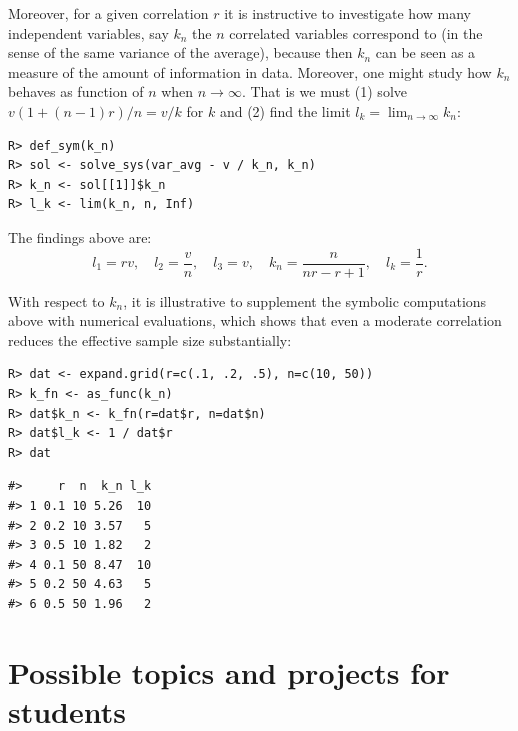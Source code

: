 Moreover, for a given correlation \(r\) it is instructive to investigate
how many independent variables, say \(k_n\) the \(n\) correlated variables
correspond to (in the sense of the same variance of the average),
because then \(k_n\) can be seen as a measure of the amount of information
in data. Moreover, one might study how \(k_n\) behaves as function of \(n\)
when \(n \rightarrow \infty\). That is we must (1) solve \(v (1 + (n-1)r)/n = v/k\) for \(k\) and (2) find the limit \(l_k = \lim_{n\rightarrow\infty} k_n\):

\begin{verbatim}
R> def_sym(k_n)
R> sol <- solve_sys(var_avg - v / k_n, k_n)
R> k_n <- sol[[1]]$k_n
R> l_k <- lim(k_n, n, Inf)
\end{verbatim}

The findings above are:
\[
l_1 = r v, \quad
l_2 = \frac{v}{n}, \quad
l_3 = v, \quad
k_n = \frac{n}{n r - r + 1}, \quad 
l_k = \frac{1}{r} .
\]

With respect to \(k_n\), it is illustrative to supplement the symbolic
computations above with numerical evaluations, which shows that
even a moderate correlation reduces the effective sample size substantially:

\begin{verbatim}
R> dat <- expand.grid(r=c(.1, .2, .5), n=c(10, 50))
R> k_fn <- as_func(k_n)
R> dat$k_n <- k_fn(r=dat$r, n=dat$n)
R> dat$l_k <- 1 / dat$r
R> dat
\end{verbatim}

\begin{verbatim}
#>     r  n  k_n l_k
#> 1 0.1 10 5.26  10
#> 2 0.2 10 3.57   5
#> 3 0.5 10 1.82   2
#> 4 0.1 50 8.47  10
#> 5 0.2 50 4.63   5
#> 6 0.5 50 1.96   2
\end{verbatim}

\hypertarget{possible-topics-and-projects-for-students}{%
\section{Possible topics and projects for students}\label{possible-topics-and-projects-for-students}}

